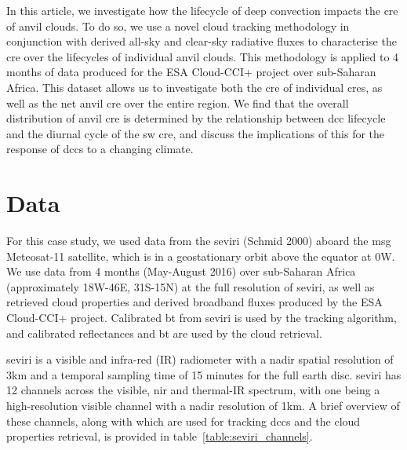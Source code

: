 In this article, we investigate how the lifecycle of deep convection impacts the \acrshort{cre} of anvil clouds. 
To do so, we use a novel cloud tracking methodology in conjunction with derived all-sky and clear-sky radiative fluxes to characterise the \acrshort{cre} over the lifecycles of individual anvil clouds. 
This methodology is applied to 4 months of data produced for the ESA Cloud-CCI+ project over sub-Saharan Africa. 
This dataset allows us to investigate both the \acrshort{cre} of individual \acrshort{cre}s, as well as the net anvil \acrshort{cre} over the entire region. 
We find that the overall distribution of anvil \acrshort{cre} is determined by the relationship between \acrshort{dcc} lifecycle and the diurnal cycle of the \acrshort{sw} \acrshort{cre}, and discuss the implications of this for the response of \acrshort{dcc}s to a changing climate.

\section{Data}

For this case study, we used data from the \acrshort{seviri} (Schmid 2000) aboard the \acrshort{msg} Meteosat-11 satellite, which is in a geostationary orbit above the equator at 0\textdegree W. 
We use data from 4 months (May-August 2016) over sub-Saharan Africa (approximately 18\textdegree W-46\textdegree E, 31\textdegree S-15\textdegree N) at the full resolution of \acrshort{seviri}, as well as retrieved cloud properties and derived broadband fluxes produced by the ESA Cloud-CCI+ project.
Calibrated \acrshort{bt} from \acrshort{seviri} is used by the tracking algorithm, and calibrated reflectances and \acrshort{bt} are used by the cloud retrieval.

\acrshort{seviri} is a visible and infra-red (IR) radiometer with a nadir spatial resolution of 3km and a temporal sampling time of 15 minutes for the full earth disc. 
\acrshort{seviri} has 12 channels across the visible, \acrshort{nir} and thermal-IR spectrum, with one being a high-resolution visible channel with a nadir resolution of 1km. 
A brief overview of these channels, along with which are used for tracking \acrshort{dcc}s and the cloud properties retrieval, is provided in table~\ref{table:seviri_channels}.


